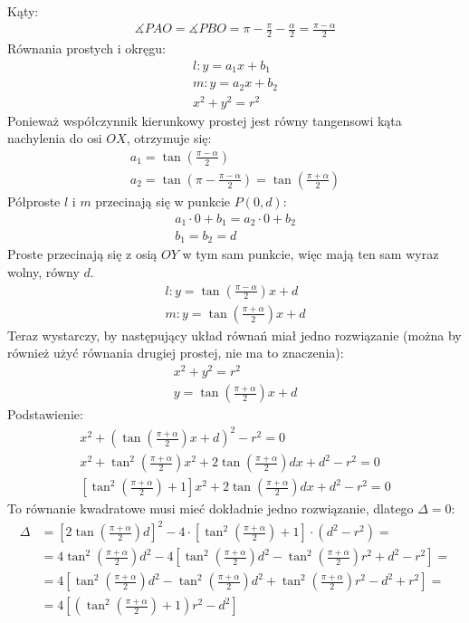 \noindent Kąty:
\begin{gather*}
\measuredangle PAO = \measuredangle PBO = \pi - \frac{\pi}{2} - \frac{\alpha}{2} = \frac{\pi - \alpha}{2} 
\end{gather*}
Równania prostych i okręgu:
\begin{gather*}
l: y = a_1x + b_1 \\
m: y = a_2x + b_2 \\
x^2 + y^2 = r^2
\end{gather*}
Ponieważ współczynnik kierunkowy prostej jest równy tangensowi kąta nachylenia do osi $OX$, otrzymuje się:
\begin{gather*}
a_1 = \tan (\frac{\pi - \alpha}{2}) \\ 
a_2 = \tan (\pi - \frac{\pi - \alpha}{2}) = \tan (\frac{\pi + \alpha}{2})
\end{gather*}
Półproste $l$ i $m$ przecinają się w punkcie $P(0, d)$:
\begin{gather*}
a_1 \cdot 0 + b_1 = a_2 \cdot 0 + b_2 \\
b_1 = b_2 = d
\end{gather*}
Proste przecinają się z osią $OY$ w tym sam punkcie, więc mają ten sam wyraz wolny, równy $d$.
\begin{gather*}
l: y = \tan (\frac{\pi - \alpha}{2})x + d \\
m: y = \tan (\frac{\pi + \alpha}{2})x + d
\end{gather*}
Teraz wystarczy, by następujący układ równań miał jedno rozwiązanie (można by również użyć równania drugiej prostej, nie ma to znaczenia):
\begin{gather*}
x^2 + y^2 = r^2 \\ 
y = \tan (\frac{\pi + \alpha}{2})x + d
\end{gather*}
Podstawienie:
\begin{gather*}
x^2 + (\tan(\frac{\pi + \alpha}{2})x + d)^2 - r^2 = 0 \\
x^2 + \tan^2(\frac{\pi + \alpha}{2})x^2 + 2\tan(\frac{\pi + \alpha}{2})dx + d^2 - r^2 = 0 \\
[\tan^2(\frac{\pi + \alpha}{2}) + 1]x^2 + 2\tan(\frac{\pi + \alpha}{2})dx + d^2 - r^2 = 0
\end{gather*}
To równanie kwadratowe musi mieć dokładnie jedno rozwiązanie, dlatego $\Delta = 0$:
\begin{equation*}
\begin{split}
\Delta & = [2\tan(\frac{\pi + \alpha}{2})d]^2 - 4\cdot[\tan^2(\frac{\pi + \alpha}{2}) + 1]\cdot (d^2 - r^2) = \\
 & = 4\tan^2(\frac{\pi + \alpha}{2})d^2 - 4[\tan^2(\frac{\pi + \alpha}{2})d^2 - \tan^2(\frac{\pi + \alpha}{2})r^2 + d^2 - r^2] = \\
 & = 4[\tan^2(\frac{\pi + \alpha}{2})d^2 - \tan^2(\frac{\pi + \alpha}{2})d^2 + \tan^2(\frac{\pi + \alpha}{2})r^2 - d^2 + r^2] = \\
 & = 4[(\tan^2(\frac{\pi + \alpha}{2}) + 1)r^2 - d^2]
\end{split}
\end{equation*}
